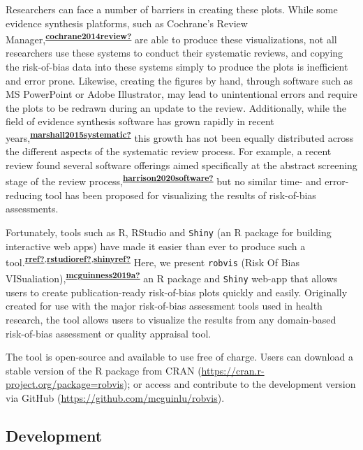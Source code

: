 \documentclass[a4paper, twoside]{templates/ociamthesis}
\begin{document}
Researchers can face a number of barriers in creating these plots. While some evidence synthesis platforms, such as Cochrane's Review Manager,\textsuperscript{\protect\hyperlink{ref-cochrane2014review}{\textbf{cochrane2014review?}}} are able to produce these visualizations, not all researchers use these systems to conduct their systematic reviews, and copying the risk-of-bias data into these systems simply to produce the plots is inefficient and error prone. Likewise, creating the figures by hand, through software such as MS PowerPoint or Adobe Illustrator, may lead to unintentional errors and require the plots to be redrawn during an update to the review. Additionally, while the field of evidence synthesis software has grown rapidly in recent years,\textsuperscript{\protect\hyperlink{ref-marshall2015systematic}{\textbf{marshall2015systematic?}}} this growth has not been equally distributed across the different aspects of the systematic review process. For example, a recent review found several software offerings aimed specifically at the abstract screening stage of the review process,\textsuperscript{\protect\hyperlink{ref-harrison2020software}{\textbf{harrison2020software?}}} but no similar time- and error-reducing tool has been proposed for visualizing the results of risk-of-bias assessments.

Fortunately, tools such as R, RStudio and \texttt{Shiny} (an R package for building interactive web apps) have made it easier than ever to produce such a tool.\textsuperscript{\protect\hyperlink{ref-rref}{\textbf{rref?}},\protect\hyperlink{ref-rstudioref}{\textbf{rstudioref?}},\protect\hyperlink{ref-shinyref}{\textbf{shinyref?}}} Here, we present \texttt{robvis} (Risk Of Bias VISualiation),\textsuperscript{\protect\hyperlink{ref-mcguinness2019a}{\textbf{mcguinness2019a?}}} an R package and \texttt{Shiny} web-app that allows users to create publication-ready risk-of-bias plots quickly and easily. Originally created for use with the major risk-of-bias assessment tools used in health research, the tool allows users to visualize the results from any domain-based risk-of-bias assessment or quality appraisal tool.

The tool is open-source and available to use free of charge. Users can download a stable version of the R package from CRAN (\url{https://cran.r-project.org/package=robvis}); or access and contribute to the development version via GitHub (\url{https://github.com/mcguinlu/robvis}).

\hypertarget{development-1}{%
\subsection{Development}\label{development-1}}
\end{document}
